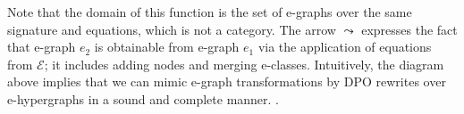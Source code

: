 Note that the domain of this function is the set of e-graphs over the same signature and equations, which is not a category.
The arrow $\leadsto$ expresses the fact that e-graph $e_2$ is obtainable from e-graph $e_1$ via the application of equations from $\mathcal{E}$; it includes adding nodes and merging e-classes.
Intuitively, the diagram above implies that we can mimic e-graph transformations by DPO rewrites over e-hypergraphs in a sound and complete manner.
.
